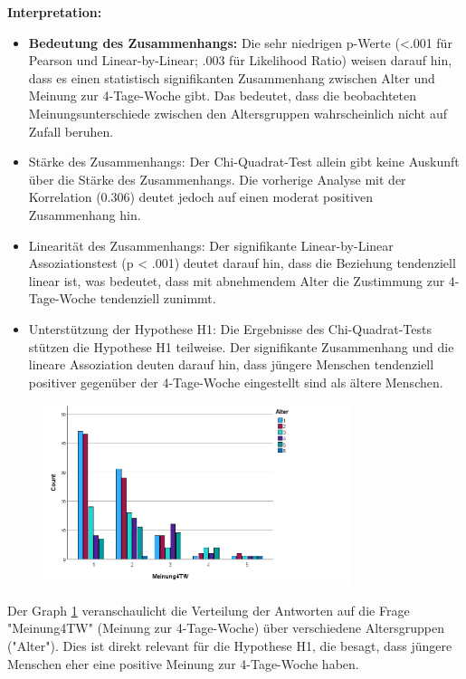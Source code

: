 \textbf{Interpretation:}
\begin{itemize}
    \item \textbf{Bedeutung des Zusammenhangs: }Die sehr niedrigen p-Werte (<.001 für Pearson und 
    Linear-by-Linear; .003 für Likelihood Ratio) weisen darauf hin, dass es einen statistisch 
    signifikanten Zusammenhang zwischen Alter und Meinung zur 4-Tage-Woche gibt. Das bedeutet, dass 
    die beobachteten Meinungsunterschiede zwischen den Altersgruppen wahrscheinlich nicht auf Zufall 
    beruhen.
    \item Stärke des Zusammenhangs: Der Chi-Quadrat-Test allein gibt keine Auskunft über die Stärke 
    des Zusammenhangs. Die vorherige Analyse mit der Korrelation (0.306) deutet jedoch auf einen 
    moderat positiven Zusammenhang hin.
    \item Linearität des Zusammenhangs: Der signifikante Linear-by-Linear Assoziationstest (p < .001) 
    deutet darauf hin, dass die Beziehung tendenziell linear ist, was bedeutet, dass mit abnehmendem 
    Alter die Zustimmung zur 4-Tage-Woche tendenziell zunimmt.
    \item Unterstützung der Hypothese H1: Die Ergebnisse des Chi-Quadrat-Tests stützen die Hypothese 
    H1 teilweise. Der signifikante Zusammenhang und die lineare Assoziation deuten darauf hin, dass 
    jüngere Menschen tendenziell positiver gegenüber der 4-Tage-Woche eingestellt sind als ältere 
    Menschen.
\end{itemize}

\begin{figure}[h]
    \centering
    \includegraphics[width=0.8\textwidth]{04_Artefakte/01_Abbildungen/hypothese_1/h1_graph.png}
    \caption{}
    \label{fig:h1_graph}
\end{figure}

Der Graph \ref{fig:h1_graph} veranschaulicht die Verteilung der Antworten auf die Frage "Meinung4TW" 
(Meinung zur 4-Tage-Woche) über verschiedene Altersgruppen ("Alter"). Dies ist direkt relevant für 
die Hypothese H1, die besagt, dass jüngere Menschen eher eine positive Meinung zur 4-Tage-Woche haben.


